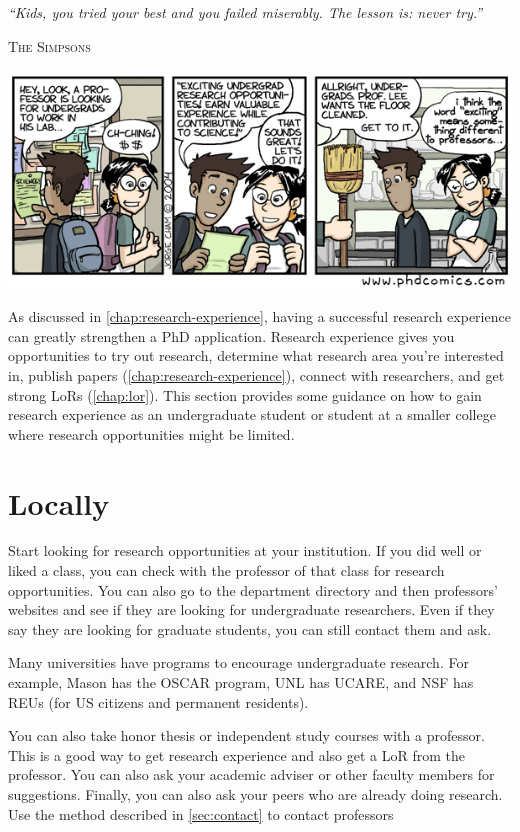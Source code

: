 \documentclass[oneside,11pt,dvipsnames]{book}
\newcommand{\myepigraphsimpsons}[1]{
\epigraph{\vspace{-0.2in} \emph{#1}}{\textsc{The Simpsons}}
}
\begin{document}
\myepigraphsimpsons{``Kids, you tried your best and you failed miserably. The lesson is: never try.''}

\begin{center}
    \includegraphics[scale=0.5]{files/phd100404s.png}
  \end{center}

As discussed in \autoref{chap:research-experience}, having a successful research experience can greatly strengthen a PhD application. Research experience gives you opportunities to try out research, determine what research area you're interested in, publish papers (\autoref{chap:research-experience}), connect with researchers, and get strong LoRs (\autoref{chap:lor}). This section provides some guidance on how to gain research experience as an undergraduate student or student at a smaller college where research opportunities might be limited.

\section{Locally} 

Start looking for research opportunities at your institution.
If you did well or liked a class, you can check with the professor of that class for research opportunities.
You can also go to the department directory and then professors' websites and see if they are looking for undergraduate researchers.
Even if they say they are looking for graduate students, you can still contact them and ask.

Many universities have programs to encourage undergraduate research. For example, Mason has the OSCAR program, UNL has UCARE, and NSF has REUs (for US citizens and permanent residents).

You can also take honor thesis or independent study courses with a professor.  This is a good way to get research experience and also get a LoR from the professor.  You can also ask your academic adviser or other faculty members for suggestions.  Finally, you can also ask your peers who are already doing research.  Use the method described in \autoref{sec:contact} to contact professors
\end{document}
